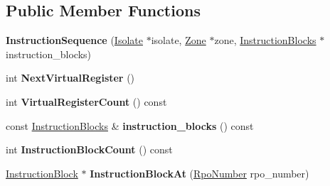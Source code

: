 \subsection*{Public Member Functions}
\begin{DoxyCompactItemize}
\item 
{\bfseries Instruction\+Sequence} (\hyperlink{classv8_1_1internal_1_1_isolate}{Isolate} $\ast$isolate, \hyperlink{classv8_1_1internal_1_1_zone}{Zone} $\ast$zone, \hyperlink{classv8_1_1internal_1_1_zone_vector}{Instruction\+Blocks} $\ast$instruction\+\_\+blocks)\hypertarget{classv8_1_1internal_1_1compiler_1_1_instruction_sequence_aae3d24f3e9291a4e9aeb97c6d6b074c9}{}\label{classv8_1_1internal_1_1compiler_1_1_instruction_sequence_aae3d24f3e9291a4e9aeb97c6d6b074c9}

\item 
int {\bfseries Next\+Virtual\+Register} ()\hypertarget{classv8_1_1internal_1_1compiler_1_1_instruction_sequence_aad92360c5302421950fd346e8d55b8e7}{}\label{classv8_1_1internal_1_1compiler_1_1_instruction_sequence_aad92360c5302421950fd346e8d55b8e7}

\item 
int {\bfseries Virtual\+Register\+Count} () const \hypertarget{classv8_1_1internal_1_1compiler_1_1_instruction_sequence_a85c2551bffcc8f4ea96596d9c0a2f360}{}\label{classv8_1_1internal_1_1compiler_1_1_instruction_sequence_a85c2551bffcc8f4ea96596d9c0a2f360}

\item 
const \hyperlink{classv8_1_1internal_1_1_zone_vector}{Instruction\+Blocks} \& {\bfseries instruction\+\_\+blocks} () const \hypertarget{classv8_1_1internal_1_1compiler_1_1_instruction_sequence_ac50c5485cf528e98509eaac87b1aef01}{}\label{classv8_1_1internal_1_1compiler_1_1_instruction_sequence_ac50c5485cf528e98509eaac87b1aef01}

\item 
int {\bfseries Instruction\+Block\+Count} () const \hypertarget{classv8_1_1internal_1_1compiler_1_1_instruction_sequence_a951d250a0f8341cd5a76924b9fc4b752}{}\label{classv8_1_1internal_1_1compiler_1_1_instruction_sequence_a951d250a0f8341cd5a76924b9fc4b752}

\item 
\hyperlink{classv8_1_1internal_1_1compiler_1_1_instruction_block}{Instruction\+Block} $\ast$ {\bfseries Instruction\+Block\+At} (\hyperlink{classv8_1_1internal_1_1compiler_1_1_rpo_number}{Rpo\+Number} rpo\+\_\+number)\hypertarget{classv8_1_1internal_1_1compiler_1_1_instruction_sequence_a9c3aecd79b289855c043cc27c2749b35}{}\label{classv8_1_1internal_1_1compiler_1_1_instruction_sequence_a9c3aecd79b289855c043cc27c2749b35}


\end{DoxyCompactItemize}
